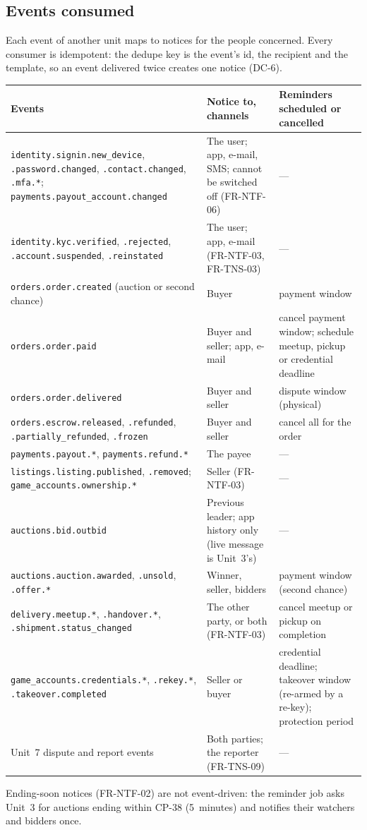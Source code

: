 \documentclass[11pt,a4paper]{article}
\newenvironment{dtable}[1]{\small\begin{longtable}{#1}}{\end{longtable}}
\begin{document}
\subsection{Events consumed}
\label{sec:map}
Each event of another unit maps to notices for the people concerned. Every consumer is idempotent: the dedupe key is the event's id, the recipient and the template, so an event delivered twice creates one notice (DC-6).
\begin{dtable}{@{}>{\raggedright\arraybackslash}p{5.9cm}>{\raggedright\arraybackslash}p{4.6cm}>{\raggedright\arraybackslash}p{4.7cm}@{}}
\toprule
\textbf{Events} & \textbf{Notice to, channels} & \textbf{Reminders scheduled or cancelled} \\ \midrule \endhead
\texttt{identity.signin.new\_device}, \texttt{.password.changed}, \texttt{.contact.changed}, \texttt{.mfa.*}; \texttt{payments.payout\_account.changed} & The user; app, e-mail, SMS; cannot be switched off (FR-NTF-06) & --- \\
\texttt{identity.kyc.verified}, \texttt{.rejected}, \texttt{.account.suspended}, \texttt{.reinstated} & The user; app, e-mail (FR-NTF-03, FR-TNS-03) & --- \\
\texttt{orders.order.created} (auction or second chance) & Buyer & payment window \\
\texttt{orders.order.paid} & Buyer and seller; app, e-mail & cancel payment window; schedule meetup, pickup or credential deadline \\
\texttt{orders.order.delivered} & Buyer and seller & dispute window (physical) \\
\texttt{orders.escrow.released}, \texttt{.refunded}, \texttt{.partially\_refunded}, \texttt{.frozen} & Buyer and seller & cancel all for the order \\
\texttt{payments.payout.*}, \texttt{payments.refund.*} & The payee & --- \\
\texttt{listings.listing.published}, \texttt{.removed}; \texttt{game\_accounts.ownership.*} & Seller (FR-NTF-03) & --- \\
\texttt{auctions.bid.outbid} & Previous leader; app history only (live message is Unit~3's) & --- \\
\texttt{auctions.auction.awarded}, \texttt{.unsold}, \texttt{.offer.*} & Winner, seller, bidders & payment window (second chance) \\
\texttt{delivery.meetup.*}, \texttt{.handover.*}, \texttt{.shipment.status\_changed} & The other party, or both (FR-NTF-03) & cancel meetup or pickup on completion \\
\texttt{game\_accounts.credentials.*}, \texttt{.rekey.*}, \texttt{.takeover.completed} & Seller or buyer & credential deadline; takeover window (re-armed by a re-key); protection period \\
Unit~7 dispute and report events & Both parties; the reporter (FR-TNS-09) & --- \\
\bottomrule
\end{dtable}
Ending-soon notices (FR-NTF-02) are not event-driven: the reminder job asks Unit~3 for auctions ending within CP-38 (5~minutes) and notifies their watchers and bidders once.
\end{document}
